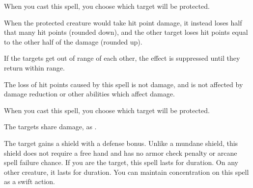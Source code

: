 \begin{spellheader}
    \spellrng{\rngmed}
    \spelldur{\durlong \dismissable}
    \spellspecial When you cast this spell, you choose which target will be protected.
\end{spellheader}
\begin{spelleffects}
    \spelleffect When the protected creature would take hit point damage, it instead loses half that many hit points (rounded down), and the other target loses hit points equal to the other half of the damage (rounded up).

    If the targets get out of range of each other, the effect is suppressed until they return within range.
\end{spelleffects}
\begin{spellfooter}
    \spellnotes The loss of hit points caused by this spell is not damage, and is not affected by damage reduction or other abilities which affect damage.
\end{spellfooter}

\begin{spellheader}
    \spellrng{\rngmed}
    \spelldur{\durlong \dismissable}
    \spellspecial When you cast this spell, you choose which target will be protected.
\end{spellheader}
\begin{spelleffects}
    \begin{spellmargin}
        \spellsuccess The targets share damage, as .
    \end{spellmargin}
\end{spelleffects}
\begin{spellfooter}

\end{spellfooter}

\begin{spellheader}
    \spellrng{\rngclose}
\end{spellheader}
\begin{spelleffects}
    \spelleffect The target gains a shield with a  defense bonus. \spellbonusscalingdescription Unlike a mundane shield, this shield does not require a free hand and has no armor check penalty or arcane spell failure chance.
    \spellspecial If you are the target, this spell lasts for \durlong duration. On any other creature, it lasts for \durshort duration. You can maintain concentration on this spell as a swift action.
\end{spelleffects}
\begin{spellfooter}

\end{spellfooter}


